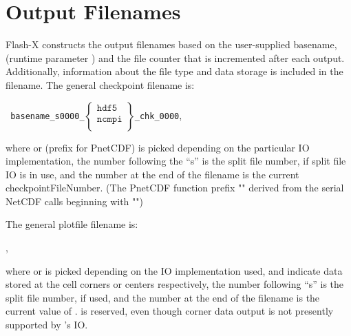 \section{Output Filenames}
\label{Sec:Output file names}


Flash-X constructs the output filenames%
based on the user-supplied basename, (runtime parameter )
and the file counter that is incremented after each output.
Additionally, information about the file type and data storage is
included in the filename.  The general checkpoint filename is:
\medskip

\texttt{
basename\_s0000\_$\left\{\begin{array}{c}\mathtt{hdf5}\\ \mathtt{ncmpi}\\
             \end{array}\right\}$\_chk\_0000}\enskip,
\medskip

\noindent
where  or  (prefix for PnetCDF) is picked
depending on the particular IO implementation, the number following the ``s'' is 
the split file number, if split file IO is in use, 
and the number at the end of the
filename is the current checkpointFileNumber.  (The PnetCDF function
prefix "" derived from the serial NetCDF calls beginning with
"")

The general plotfile filename is:
\medskip

\enskip,
\medskip



\noindent
where  or  is picked depending on the IO
implementation used,
 and  indicate data stored at the
cell corners or centers respectively, the number following ``s'' is the split file 
number, if used, and the number at the end of the
filename is the current value of .   is reserved, even though 
corner data output is not presently supported by \flashx's IO.

